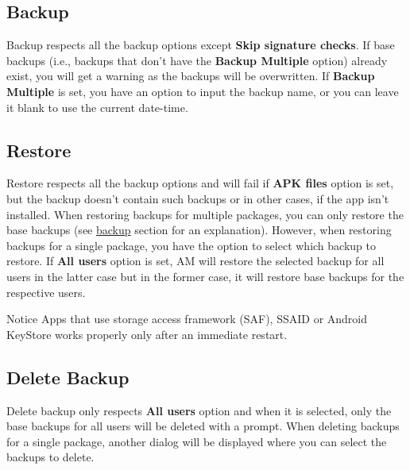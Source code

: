 \subsection{Backup}\label{subsec:backup-restore-backup} %
Backup respects all the backup options except \textbf{Skip signature checks}.
If base backups (i.e., backups that don't have the \textbf{Backup Multiple} option) already exist, you will get a warning as the backups will be overwritten.
If \textbf{Backup Multiple} is set, you have an option to input the backup name, or you can leave it blank to use the current date-time.

\subsection{Restore}\label{subsec:backup-restore-restore} %
Restore respects all the backup options and will fail if \textbf{APK files} option is set, but the backup doesn't
contain such backups or in other cases, if the app isn't installed.
When restoring backups for multiple packages, you can only restore the base backups (see \hyperref[subsec:backup-restore-backup]{backup} section for an explanation).
However, when restoring backups for a single package, you have the option to select which backup to restore.
If \textbf{All users} option is set, AM will restore the selected backup for all users in the latter case but in the former case, it will restore base backups for the respective users.

\begin{tip}{Notice}
    Apps that use storage access framework (SAF), SSAID or Android KeyStore works properly only after an immediate restart.
\end{tip}

\subsection{Delete Backup}\label{subsec:backup-restore-delete-backup} %
Delete backup only respects \textbf{All users} option and when it is selected, only the base backups for all users will be deleted with a prompt.
When deleting backups for a single package, another dialog will be displayed where you can select the backups to delete.
